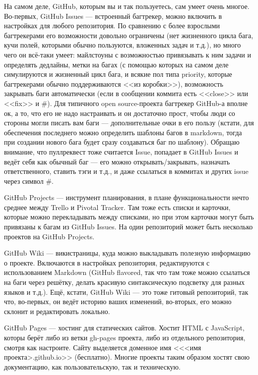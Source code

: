 \documentclass[a5paper]{article}
\begin{document}
На самом деле, GitHub, которым вы и так пользуетесь, сам умеет очень многое. Во-первых, GitHub Issues --- встроенный багтрекер, можно включить в настройках для любого репозитория. По сравнению с более взрослыми багтрекерами его возможности довольно ограничены (нет жизненного цикла бага, кучи полей, которыми обычно пользуются, вложенных задач и т.д.), но много чего он всё-таки умеет: майлстоуны с возможностью привязывать к ним задачи и определять дедлайны, метки на багах (с помощью которых на самом деле симулируются и жизненный цикл бага, и всякие пол типа priority, которые багтрекерами обычно поддерживаются <<из коробки>>),  возможность закрывать баги автоматически (если в сообщении коммита есть <<close>> или <<fix>> и \#<номер бага>). Для типичного open source-проекта багтрекер GitHub-а вполне ок, а то, что его не надо настраивать и он достаточно прост, чтобы люди со стороны могли писать вам баги --- дополнительные очки в его пользу (кстати, для обеспечения последнего можно определить шаблоны багов в markdown, тогда при создании нового бага будет сразу создаваться баг по шаблону). Обращаю внимание, что пуллреквест тоже считается Issue, попадает в GitHub Issues и ведёт себя как обычный баг --- его можно открывать/закрывать, назначать ответственного, ставить тэги и т.д., и даже ссылаться в коммитах и других issue через символ \#.

GitHub Projects --- инструмент планирования, в плане функциональности нечто среднее между Trello и Pivotal Tracker. Там тоже есть списки и карточки, которые можно перекладывать между списками, но при этом карточки могут быть привязаны к багам из GitHub Issues. На один репозиторий может быть несколько проектов на GitHub Projects.

GitHub Wiki --- викистраницы, куда можно выкладывать полезную информацию о проекте. Включаются в настройках репозитория, редактируются с использованием Markdown (GitHub flavored, так что там тоже можно ссылаться на баги через решётку, делать красивую синтаксическую подсветку для разных языков и т.д.). Ещё, кстати, GitHub Wiki --- это тоже гитовый репозиторий, так что, во-первых, он ведёт историю ваших изменений, во-вторых, его можно склонит и редактировать локально.

GitHub Pages --- хостинг для статических сайтов. Хостит HTML с JavaScript, которы берёт либо из ветки gh-pages проекта, либо из отдельного репозитория, смотря как настроите. Сайту выделяется доменное имя <<<имя проекта>.github.io>> (бесплатно). Многие проекты таким образом хостят свою документацию, как пользовательскую, так и техническую. 
\end{document}
